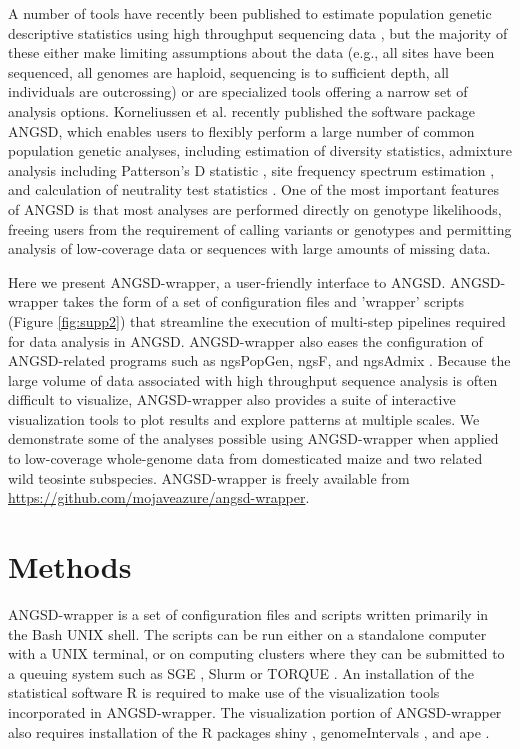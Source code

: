 \documentclass[10pt,a4paper]{article}
\newcommand{\jri}[1]{\todo[size=\scriptsize, color=flame]{#1}}
\begin{document}
A number of tools have recently been published to estimate population genetic descriptive statistics using high throughput sequencing data \citep{garrigan2013popbam, purcell2007plink, danecek2011variant, hutter2006genome}, but the majority of these either make limiting assumptions about the data (e.g., all sites have been sequenced, all genomes are haploid, sequencing is to sufficient depth, all individuals are outcrossing) or are specialized tools offering a narrow set of analysis options. 
Korneliussen et al. \citep{korneliussen2014angsd} recently published the software package ANGSD, which enables users to flexibly perform a large number of common population genetic analyses, including estimation of diversity statistics, admixture analysis including Patterson's D statistic \citep{Durand:2011jd}, site frequency spectrum estimation \citep{pmid22911679}, and calculation of neutrality test statistics \citep{korneliussen_calculation_2013}. 
One of the most important features of ANGSD is that most analyses are performed directly on genotype likelihoods, freeing users from the requirement of calling variants or genotypes and permitting analysis of low-coverage data or sequences with large amounts of missing data. 

Here we present ANGSD-wrapper, a user-friendly interface to ANGSD. 
ANGSD-wrapper takes the form of a set of configuration files and 'wrapper' scripts (Figure \ref{fig:supp2}) that streamline the execution of multi-step pipelines required for data analysis in ANGSD. 
ANGSD-wrapper also eases the configuration of ANGSD-related programs such as ngsPopGen\jri{please add citation to url for git repo}, ngsF\citep{vieira2013estimating}, and ngsAdmix \citep{pmid24026093}.
Because the large volume of data associated with high throughput sequence analysis is often difficult to visualize, ANGSD-wrapper also provides a suite of interactive visualization tools to plot results and explore patterns at multiple scales.  
We demonstrate some of the analyses possible using ANGSD-wrapper when applied to low-coverage whole-genome data from domesticated maize and two related wild teosinte subspecies. 
ANGSD-wrapper is freely available from \url{https://github.com/mojaveazure/angsd-wrapper}.

\section*{Methods}
ANGSD-wrapper is a set of configuration files and scripts written primarily in the Bash UNIX shell.  
The scripts can be run either on a standalone computer with a UNIX terminal, or on computing clusters where they can be submitted to a queuing system such as SGE \citep{Microsystems):2001:SGE:560889.792378}, Slurm \citep{Jette02slurm:simple} or TORQUE \citep{Staples:2006:TRM:1188455.1188464}.  
An installation of the statistical software R \citep{Rcitation} is required to make use of the visualization tools incorporated in ANGSD-wrapper.  
The visualization portion of ANGSD-wrapper also requires installation of the R packages shiny \citep{shiny}, genomeIntervals \citep{genomeIntervals}, and ape \citep{APE}.
\end{document}

